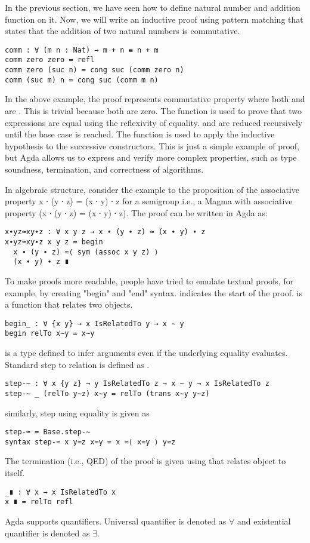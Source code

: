 In the previous section, we have seen how to define natural number and addition
function on it. Now, we will write an inductive proof using pattern matching
that states that the addition of two natural numbers is commutative.

\begin{verbatim}
comm : ∀ (m n : Nat) → m + n ≡ n + m
comm zero zero = refl
comm zero (suc n) = cong suc (comm zero n)
comm (suc m) n = cong suc (comm m n)
\end{verbatim}

In the above example, the proof  represents commutative
property where both  and  are . This is trivial
because both are zero. The  function is used to prove that two
expressions are equal using the reflexivity of equality.  and  are reduced recursively until the base case is
reached. The  function is used to apply the inductive hypothesis to the
successive  constructors. This is just a simple example of proof, but Agda
allows us to express and verify more complex properties, such as type soundness,
termination, and correctness of algorithms.

In algebraic structure, consider the example to the proposition of the associative property x ∙ (y ∙ z)
= (x ∙ y) ∙ z  for a semigroup i.e., a Magma with associative property (x ∙ (y ∙
z) = (x ∙ y) ∙ z). The proof can be written in Agda as:
\begin{verbatim}
x∙yz≈xy∙z : ∀ x y z → x ∙ (y ∙ z) ≈ (x ∙ y) ∙ z
x∙yz≈xy∙z x y z = begin 
  x ∙ (y ∙ z) ≈⟨ sym (assoc x y z) ⟩ 
  (x ∙ y) ∙ z ∎
\end{verbatim}
To make proofs more readable, people have tried to emulate textual proofs, for
example, by creating "begin" and "end" syntax.  indicates the start
of the proof.  is a function that relates two objects.
\begin{verbatim}
begin_ : ∀ {x y} → x IsRelatedTo y → x ∼ y
begin relTo x∼y = x∼y
\end{verbatim}
 is a type defined to infer arguments even if the underlying equality
evaluates. Standard step to relation is defined as .
\begin{verbatim}
step-∼ : ∀ x {y z} → y IsRelatedTo z → x ∼ y → x IsRelatedTo z
step-∼ _ (relTo y∼z) x∼y = relTo (trans x∼y y∼z)
\end{verbatim}
similarly, step using equality is given as
\begin{verbatim}
step-≈ = Base.step-∼
syntax step-≈ x y≈z x≈y = x ≈⟨ x≈y ⟩ y≈z
\end{verbatim}
The termination (i.e., QED) of the proof is given using  that relates object to itself.
\begin{verbatim}
_∎ : ∀ x → x IsRelatedTo x
x ∎ = relTo refl
\end{verbatim}
Agda supports quantifiers. Universal quantifier is denoted as \(\forall\) and
existential quantifier is denoted as \(\exists\).

